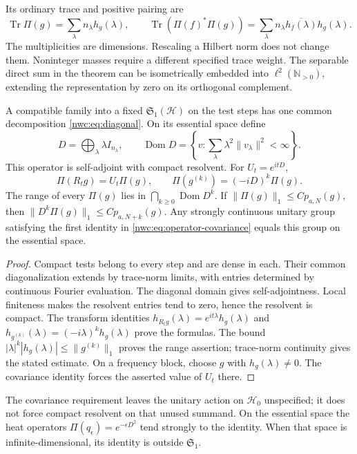 Its ordinary trace and positive pairing are
\[
 \operatorname{Tr}\Pi(g)=\sum_\lambda n_\lambda h_g(\lambda),\qquad
 \operatorname{Tr}(\Pi(f)^*\Pi(g))
   =\sum_\lambda n_\lambda\overline{h_f(\lambda)}h_g(\lambda).
\]
The multiplicities are dimensions. Rescaling a Hilbert norm does not
change them. Noninteger masses require a different specified trace
weight. The separable direct sum in the theorem can be isometrically
embedded into $\ell^2(\mathbb N_{>0})$, extending the representation
by zero on its orthogonal complement.

\begin{proposition}\label{nwc:prop:generator}
A compatible family into a fixed $\mathfrak S_1(\mathcal H)$ on the
test steps has one common decomposition
\eqref{nwc:eq:diagonal}. On its essential space define
\[
 D=\bigoplus_\lambda\lambda I_{n_\lambda},\qquad
 \operatorname{Dom}D=
 \left\{v:\sum_\lambda\lambda^2\|v_\lambda\|^2<\infty\right\}.
\]
This operator is self-adjoint with compact resolvent.
For $U_t=e^{itD}$,
\begin{equation}\label{nwc:eq:operator-covariance}
 \Pi(R_tg)=U_t\Pi(g),\qquad
 \Pi(g^{(k)})=(-iD)^k\Pi(g).
\end{equation}
The range of every $\Pi(g)$ lies in
$\bigcap_{k\geq0}\operatorname{Dom}D^k$.
If $\|\Pi(g)\|_1\leq Cp_{a,N}(g)$, then
$\|D^k\Pi(g)\|_1\leq Cp_{a,N+k}(g)$.
Any strongly continuous unitary group satisfying the first identity
in \eqref{nwc:eq:operator-covariance} equals this group on the
essential space.
\end{proposition}
\begin{proof}
Compact tests belong to every step and are dense in each.
Their common diagonalization extends by trace-norm limits, with
entries determined by continuous Fourier evaluation.
The diagonal domain gives self-adjointness.
Local finiteness makes the resolvent entries tend to zero, hence the
resolvent is compact.
The transform identities
$h_{R_tg}(\lambda)=e^{it\lambda}h_g(\lambda)$ and
$h_{g^{(k)}}(\lambda)=(-i\lambda)^kh_g(\lambda)$ prove the formulas.
The bound $|\lambda|^k|h_g(\lambda)|\leq\|g^{(k)}\|_1$ proves
the range assertion; trace-norm continuity gives the stated estimate.
On a frequency block, choose $g$ with $h_g(\lambda)\ne0$.
The covariance identity forces the asserted value of $U_t$ there.
\end{proof}

The covariance requirement leaves the unitary action on
$\mathcal H_0$ unspecified; it does not force compact resolvent on
that unused summand. On the essential space the heat operators
$\Pi(q_\epsilon)=e^{-\epsilon D^2}$ tend strongly to the identity.
When that space is infinite-dimensional, its identity is outside
$\mathfrak S_1$.

